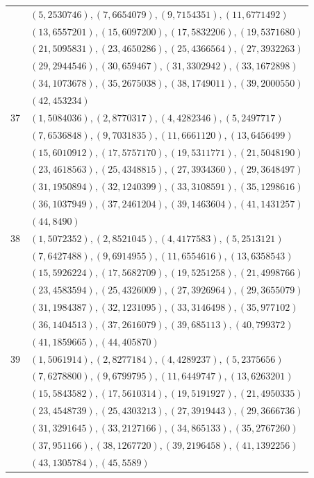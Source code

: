 \begin{longtable}{r p{}}
 & $(5,2530746), (7,6654079), (9,7154351), (11,6771492)$ \\[2pt]
 & $(13,6557201), (15,6097200), (17,5832206), (19,5371680)$ \\[2pt]
 & $(21,5095831), (23,4650286), (25,4366564), (27,3932263)$ \\[2pt]
 & $(29,2944546), (30,659467), (31,3302942), (33,1672898)$ \\[2pt]
 & $(34,1073678), (35,2675038), (38,1749011), (39,2000550)$ \\[2pt]
 & $(42,453234)$ \\[2pt]
37 & $(1,5084036), (2,8770317), (4,4282346), (5,2497717)$ \\[2pt]
 & $(7,6536848), (9,7031835), (11,6661120), (13,6456499)$ \\[2pt]
 & $(15,6010912), (17,5757170), (19,5311771), (21,5048190)$ \\[2pt]
 & $(23,4618563), (25,4348815), (27,3934360), (29,3648497)$ \\[2pt]
 & $(31,1950894), (32,1240399), (33,3108591), (35,1298616)$ \\[2pt]
 & $(36,1037949), (37,2461204), (39,1463604), (41,1431257)$ \\[2pt]
 & $(44,8490)$ \\[2pt]
38 & $(1,5072352), (2,8521045), (4,4177583), (5,2513121)$ \\[2pt]
 & $(7,6427488), (9,6914955), (11,6554616), (13,6358543)$ \\[2pt]
 & $(15,5926224), (17,5682709), (19,5251258), (21,4998766)$ \\[2pt]
 & $(23,4583594), (25,4326009), (27,3926964), (29,3655079)$ \\[2pt]
 & $(31,1984387), (32,1231095), (33,3146498), (35,977102)$ \\[2pt]
 & $(36,1404513), (37,2616079), (39,685113), (40,799372)$ \\[2pt]
 & $(41,1859665), (44,405870)$ \\[2pt]
39 & $(1,5061914), (2,8277184), (4,4289237), (5,2375656)$ \\[2pt]
 & $(7,6278800), (9,6799795), (11,6449747), (13,6263201)$ \\[2pt]
 & $(15,5843582), (17,5610314), (19,5191927), (21,4950335)$ \\[2pt]
 & $(23,4548739), (25,4303213), (27,3919443), (29,3666736)$ \\[2pt]
 & $(31,3291645), (33,2127166), (34,865133), (35,2767260)$ \\[2pt]
 & $(37,951166), (38,1267720), (39,2196458), (41,1392256)$ \\[2pt]
 & $(43,1305784), (45,5589)$ \\[2pt]
\bottomrule\end{longtable}
\normalsize

